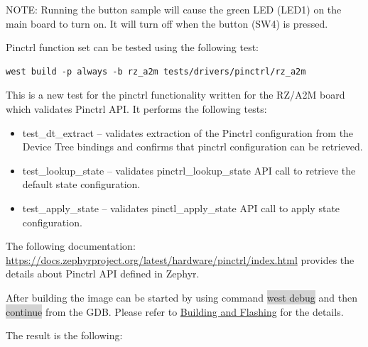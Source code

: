 \documentclass[11pt,a4paper,oneside]{article}
\begin{document}
NOTE: Running the \textquotesingle button\textquotesingle{} sample will
cause the green LED (LED1) on the main board to turn on. It will turn
off when the button (SW4) is pressed.

Pinctrl function set can be tested using the following test:

\begin{lstlisting}
west build -p always -b rz_a2m tests/drivers/pinctrl/rz_a2m
\end{lstlisting}

This is a new test for the pinctrl functionality written for the RZ/A2M
board which validates Pinctrl API. It performs the following tests:

\begin{itemize}
\item
  test\_dt\_extract -- validates extraction of the Pinctrl configuration
  from the Device Tree bindings and confirms that pinctrl configuration
  can be retrieved.
\item
  test\_lookup\_state -- validates pinctrl\_lookup\_state API call to
  retrieve the default state configuration.
\item
  test\_apply\_state -- validates pinctl\_apply\_state API call to apply
  state configuration.
\end{itemize}

The following documentation:
\url{https://docs.zephyrproject.org/latest/hardware/pinctrl/index.html}
provides the details about Pinctrl API defined in Zephyr.

After building the image can be started by using command \colorbox{lightgray}{west debug}
and then \colorbox{lightgray}{continue} from the GDB. Please refer to
\hyperref[building-and-flashing]{Building and Flashing} for the
details.

The result is the following:
\end{document}
